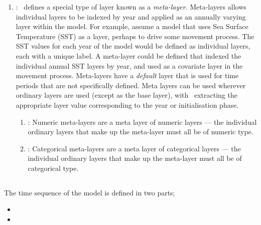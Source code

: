 \begin{enumerate}
\item {\label{meta-layers}}: \SPM\ defines a special type of layer known as a \emph{meta-layer}. Meta-layers allows individual layers to be indexed by year and applied as an annually varying layer within the model. For example, assume a model that uses Sea Surface Temperature (SST) as a layer, perhaps to drive some movement process. The SST values for each year of the model would be defined as individual layers, each with a unique label. A meta-layer could be defined that indexed the individual annual SST layers by year, and used as a covariate layer in the movement process. Meta-layers have a \emph{default} layer that is used for time periods that are not specifically defined. Meta layers can be used wherever ordinary layers are used (except as  the base layer), with \SPM\ extracting the appropriate layer value corresponding to the year or initialisation phase.

\begin{enumerate}

\item {\label{numeric meta-layer}}: Numeric meta-layers are a meta layer of numeric layers --- the individual ordinary layers that make up the meta-layer must all be of numeric type. 

\item {\label{categorical meta-layer}}: Categorical meta-layers are a meta layer of categorical layers --- the individual ordinary layers that make up the meta-layer must all be of categorical type.

\end{enumerate}
\end{enumerate}

\subsection{}

The time sequence of the model is defined in two parts;
\begin{itemize}
  \item {}
  \item {}
\end{itemize}

\subsubsection{}

